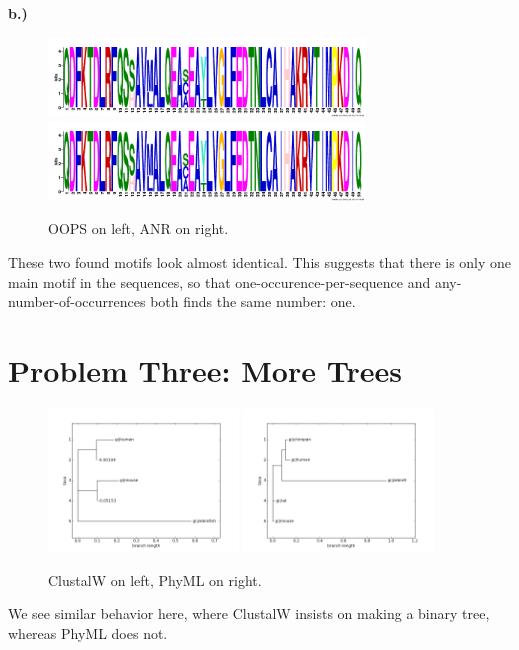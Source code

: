 \documentclass[10pt]{article} %
\begin{document}
\textbf{b.)}

\begin{figure}[h!]
  \centering
  \includegraphics[width=0.75\textwidth]{oops-logo.png}\\
  \includegraphics[width=0.75\textwidth]{anr-logo.png}
  \caption{OOPS on left, ANR on right.}
\end{figure}

These two found motifs look almost identical. This suggests that there is only one
main motif in the sequences, so that one-occurence-per-sequence and any-number-of-occurrences
both finds the same number: one.\\

\section{Problem Three: More Trees}

\begin{figure}[h!]
  \centering
  \includegraphics[width=0.45\textwidth]{clustalw.png}
  \includegraphics[width=0.45\textwidth]{phyml.png}
  \caption{ClustalW on left, PhyML on right.}
\end{figure}

We see similar behavior here, where ClustalW insists on making a binary tree, whereas PhyML does
not.
\end{document}
